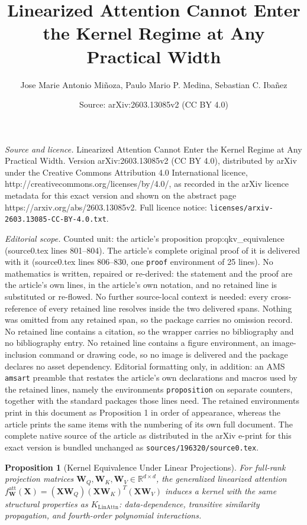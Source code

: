 \documentclass[10pt,a4paper]{amsart}
\title{Linearized Attention Cannot Enter the Kernel Regime at Any Practical Width}
\author{Jose Marie Antonio Mi\~noza, Paulo Mario P. Medina, Sebastian C. Iba\~nez}
\date{Source: arXiv:2603.13085v2 (CC BY 4.0)}
\newtheorem{proposition}{Proposition}
\newcommand{\R}{\mathbb{R}}
\begin{document}
\maketitle

\noindent\emph{Source and licence.} Linearized Attention Cannot Enter the Kernel Regime at Any Practical Width. Version arXiv:2603.13085v2 (CC BY 4.0), distributed by arXiv under the Creative Commons Attribution 4.0 International licence, http://creativecommons.org/licenses/by/4.0/, as recorded in the arXiv licence metadata for this exact version and shown on the abstract page https://arxiv.org/abs/2603.13085v2. Full licence notice: \texttt{licenses/arxiv-2603.13085-CC-BY-4.0.txt}.\par\smallskip

\noindent\textit{Editorial scope.} Counted unit: the article's proposition prop:qkv\_equivalence (source0.tex lines 801--804). The article's complete original proof of it is delivered with it (source0.tex lines 806--830, one \texttt{proof} environment of 25 lines). No mathematics is written, repaired or re-derived: the statement and the proof are the article's own lines, in the article's own notation, and no retained line is substituted or re-flowed.  No further source-local context is needed: every cross-reference of every retained line resolves inside the two delivered spans.  Nothing was omitted from any retained span, so the package carries no omission record.  No retained line contains a citation, so the wrapper carries no bibliography and no bibliography entry.  No retained line contains a figure environment, an image-inclusion command or drawing code, so no image is delivered and the package declares no asset dependency.  Editorial formatting only, in addition: an AMS \texttt{amsart} preamble that restates the article's own declarations and macros used by the retained lines, namely the environments \texttt{proposition} on separate counters, together with the standard packages those lines need.  The retained environments print in this document as Proposition 1 in order of appearance, whereas the article prints the same items with the numbering of its own full document.  The complete native source of the article as distributed in the arXiv e-print for this exact version is bundled unchanged as \texttt{sources/196320/source0.tex}.
\begin{proposition}[Kernel Equivalence Under Linear Projections]
\label{prop:qkv_equivalence}
For full-rank projection matrices $\mathbf{W}_Q, \mathbf{W}_K, \mathbf{W}_V \in \R^{d \times d}$, the generalized linearized attention $f^{\text{att}}_{\mathbf{W}}(\mathbf{X}) = (\mathbf{X}\mathbf{W}_Q)(\mathbf{X}\mathbf{W}_K)^T(\mathbf{X}\mathbf{W}_V)$ induces a kernel with the same structural properties as $K_{\text{LinAttn}}$: data-dependence, transitive similarity propagation, and fourth-order polynomial interactions.
\end{proposition}
\end{document}
